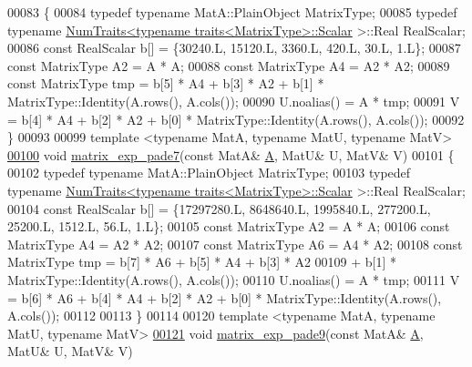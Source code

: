\begin{DoxyCode}
00083 \{
00084   \textcolor{keyword}{typedef} \textcolor{keyword}{typename} MatA::PlainObject MatrixType;
00085   \textcolor{keyword}{typedef} \textcolor{keyword}{typename} \hyperlink{group___core___module_struct_eigen_1_1_num_traits}{NumTraits<typename traits<MatrixType>::Scalar}
      >::Real RealScalar;
00086   \textcolor{keyword}{const} RealScalar b[] = \{30240.L, 15120.L, 3360.L, 420.L, 30.L, 1.L\};
00087   \textcolor{keyword}{const} MatrixType A2 = A * A;
00088   \textcolor{keyword}{const} MatrixType A4 = A2 * A2;
00089   \textcolor{keyword}{const} MatrixType tmp = b[5] * A4 + b[3] * A2 + b[1] * MatrixType::Identity(A.rows(), A.cols());
00090   U.noalias() = A * tmp;
00091   V = b[4] * A4 + b[2] * A2 + b[0] * MatrixType::Identity(A.rows(), A.cols());
00092 \}
00093 
00099 \textcolor{keyword}{template} <\textcolor{keyword}{typename} MatA, \textcolor{keyword}{typename} MatU, \textcolor{keyword}{typename} MatV>
\hyperlink{namespace_eigen_1_1internal_a1abecb439e6cb1b5188828cdb7e0ab60}{00100} \textcolor{keywordtype}{void} \hyperlink{namespace_eigen_1_1internal_a1abecb439e6cb1b5188828cdb7e0ab60}{matrix\_exp\_pade7}(\textcolor{keyword}{const} MatA& \hyperlink{group___core___module_class_eigen_1_1_matrix}{A}, MatU& U, MatV& V)
00101 \{
00102   \textcolor{keyword}{typedef} \textcolor{keyword}{typename} MatA::PlainObject MatrixType;
00103   \textcolor{keyword}{typedef} \textcolor{keyword}{typename} \hyperlink{group___core___module_struct_eigen_1_1_num_traits}{NumTraits<typename traits<MatrixType>::Scalar}
      >::Real RealScalar;
00104   \textcolor{keyword}{const} RealScalar b[] = \{17297280.L, 8648640.L, 1995840.L, 277200.L, 25200.L, 1512.L, 56.L, 1.L\};
00105   \textcolor{keyword}{const} MatrixType A2 = A * A;
00106   \textcolor{keyword}{const} MatrixType A4 = A2 * A2;
00107   \textcolor{keyword}{const} MatrixType A6 = A4 * A2;
00108   \textcolor{keyword}{const} MatrixType tmp = b[7] * A6 + b[5] * A4 + b[3] * A2 
00109     + b[1] * MatrixType::Identity(A.rows(), A.cols());
00110   U.noalias() = A * tmp;
00111   V = b[6] * A6 + b[4] * A4 + b[2] * A2 + b[0] * MatrixType::Identity(A.rows(), A.cols());
00112 
00113 \}
00114 
00120 \textcolor{keyword}{template} <\textcolor{keyword}{typename} MatA, \textcolor{keyword}{typename} MatU, \textcolor{keyword}{typename} MatV>
\hyperlink{namespace_eigen_1_1internal_a218447e97bf869bf354f92e020a7355a}{00121} \textcolor{keywordtype}{void} \hyperlink{namespace_eigen_1_1internal_a218447e97bf869bf354f92e020a7355a}{matrix\_exp\_pade9}(\textcolor{keyword}{const} MatA& \hyperlink{group___core___module_class_eigen_1_1_matrix}{A}, MatU& U, MatV& V)

\end{DoxyCode}
